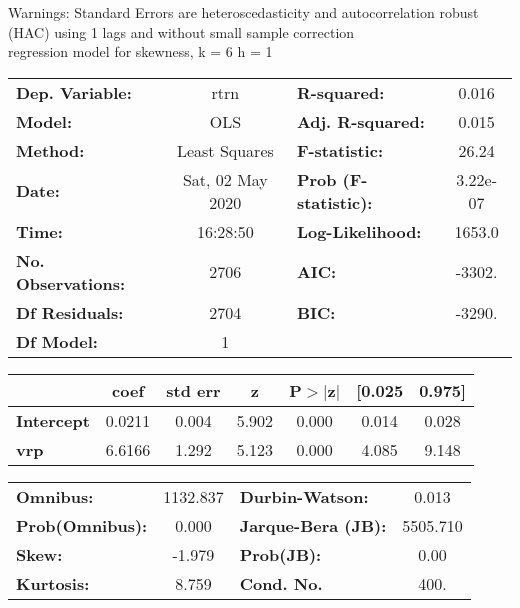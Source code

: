 Warnings: \newline
 [1] Standard Errors are heteroscedasticity and autocorrelation robust (HAC) using 1 lags and without small sample correction\\ 

regression model for skewness, k = 6 h = 1\begin{center}
\begin{tabular}{lclc}
\toprule
\textbf{Dep. Variable:}    &       rtrn       & \textbf{  R-squared:         } &     0.016   \\
\textbf{Model:}            &       OLS        & \textbf{  Adj. R-squared:    } &     0.015   \\
\textbf{Method:}           &  Least Squares   & \textbf{  F-statistic:       } &     26.24   \\
\textbf{Date:}             & Sat, 02 May 2020 & \textbf{  Prob (F-statistic):} &  3.22e-07   \\
\textbf{Time:}             &     16:28:50     & \textbf{  Log-Likelihood:    } &    1653.0   \\
\textbf{No. Observations:} &        2706      & \textbf{  AIC:               } &    -3302.   \\
\textbf{Df Residuals:}     &        2704      & \textbf{  BIC:               } &    -3290.   \\
\textbf{Df Model:}         &           1      & \textbf{                     } &             \\
\bottomrule
\end{tabular}
\begin{tabular}{lcccccc}
                   & \textbf{coef} & \textbf{std err} & \textbf{z} & \textbf{P$> |$z$|$} & \textbf{[0.025} & \textbf{0.975]}  \\
\midrule
\textbf{Intercept} &       0.0211  &        0.004     &     5.902  &         0.000        &        0.014    &        0.028     \\
\textbf{vrp}       &       6.6166  &        1.292     &     5.123  &         0.000        &        4.085    &        9.148     \\
\bottomrule
\end{tabular}
\begin{tabular}{lclc}
\textbf{Omnibus:}       & 1132.837 & \textbf{  Durbin-Watson:     } &    0.013  \\
\textbf{Prob(Omnibus):} &   0.000  & \textbf{  Jarque-Bera (JB):  } & 5505.710  \\
\textbf{Skew:}          &  -1.979  & \textbf{  Prob(JB):          } &     0.00  \\
\textbf{Kurtosis:}      &   8.759  & \textbf{  Cond. No.          } &     400.  \\
\bottomrule
\end{tabular}
\end{center}

